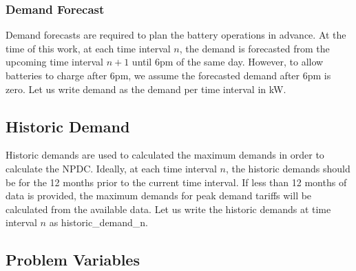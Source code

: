 \subsubsection{Demand Forecast}

Demand forecasts are required to plan the battery operations in advance. 
At the time of this work, at each time interval $n$, the demand is forecasted from the upcoming time interval $n+1$ until 6pm of the same day.  However, to allow batteries to charge after 6pm, we assume the forecasted demand after 6pm is zero. Let us write \gls{demand} as the demand per time interval in kW. 


\subsection{Historic Demand}

Historic demands are used to calculated the maximum demands in order to calculate the \gls{NPDC}. Ideally, at each time interval $n$, the historic demands should be for the 12 months prior to the current time interval. If less than 12 months of data is provided, the maximum demands for peak demand tariffs will be calculated from the available data. Let us write the historic demands at time interval $n$ as \gls{historic_demand_n}.


\subsection{Problem Variables}

